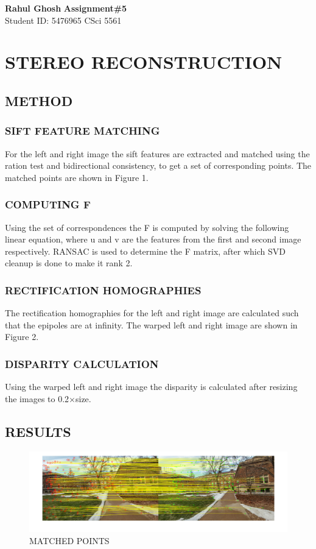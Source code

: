 \documentclass[letter, 10pt]{article}
\begin{document}
\noindent
\large \textbf{Rahul Ghosh} \hfill \textbf{Assignment\#5}\\
\normalsize Student ID: 5476965 \hfill CSci 5561\\

\section*{\centering STEREO RECONSTRUCTION}

\subsection*{METHOD}
\subsubsection*{SIFT FEATURE MATCHING}
For the left and right image the sift features are extracted and matched using the ration test and bidirectional consistency, to get a set of corresponding points. The matched points are shown in Figure 1.

\subsubsection*{COMPUTING F}
Using the set of correspondences the F is computed by solving the following linear equation, where u and v are the features from the first and second image respectively. RANSAC is used to determine the F matrix, after which SVD cleanup is done to make it rank 2. 

\subsubsection*{RECTIFICATION HOMOGRAPHIES}
The rectification homographies for the left and right image are calculated such that the epipoles are at infinity. The warped left and right image are shown in Figure 2.

\subsubsection*{DISPARITY CALCULATION}
Using the warped left and right image the disparity is calculated after resizing the images to 0.2$\times$size.

\subsection*{RESULTS}

\begin{figure}[H]
    \centering
    \includegraphics[width=\textwidth]{HW5/RESULT/matched_points.png}
    \caption{MATCHED POINTS}
    \label{fig:my_label}
\end{figure}
\end{document}
